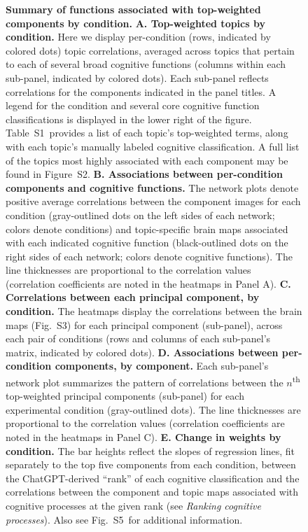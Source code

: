 \documentclass[english, 11pt]{article}
\newcommand{\topTerms}{S2}
\newcommand{\componentBrains}{S3}
\newcommand{\neurosynthFull}{S5}
\newcommand{\topics}{S1}
\begin{document}
\begin{figure}[tp]
\caption{\textbf{Summary of functions associated with top-weighted components
by condition.} \textbf{A. Top-weighted topics by condition.} Here we display
per-condition (rows, indicated by colored dots) topic correlations, averaged
across topics that pertain to each of several broad cognitive functions
(columns within each sub-panel, indicated by colored dots). Each sub-panel
reflects correlations for the components indicated in the panel titles. A
legend for the condition and several core cognitive function classifications is
displayed in the lower right of the figure. Table~\topics~provides a list of
each topic's top-weighted terms, along with each topic's manually labeled
cognitive classification. A full list of the topics most highly associated with
each component may be found in Figure~\topTerms. \textbf{B. Associations
between per-condition components and cognitive functions.} The network plots
denote positive average correlations between the component images for each
condition (gray-outlined dots on the left sides of each network; colors denote
conditions) and topic-specific brain maps associated with each indicated
cognitive function (black-outlined dots on the right sides of each network;
colors denote cognitive functions). The line thicknesses are proportional to
the correlation values (correlation coefficients are noted in the heatmaps in
Panel A). \textbf{C. Correlations between each principal component, by
condition.} The heatmaps display the correlations between the brain maps
(Fig.~\componentBrains) for each principal component (sub-panel), across each
pair of conditions (rows and columns of each sub-panel's matrix, indicated by
colored dots). \textbf{D. Associations between per-condition components, by
component.} Each sub-panel's network plot summarizes the pattern of correlations
between the $n$\textsuperscript{th} top-weighted principal components
(sub-panel) for each experimental condition (gray-outlined dots). The line
thicknesses are proportional to the correlation values (correlation
coefficients are noted in the heatmaps in Panel C). \textbf{E. Change in
weights by condition.} The bar heights reflect the slopes of regression lines,
fit separately to the top five components from each condition, between the
ChatGPT-derived ``rank'' of each cognitive classification and the correlations
between the component and topic maps associated with cognitive processes at the
given rank (see \textit{Ranking cognitive processes}).  Also see
Fig.~\neurosynthFull~for additional information.}

\label{fig:neurosynth-summary}
\end{figure}
\end{document}
